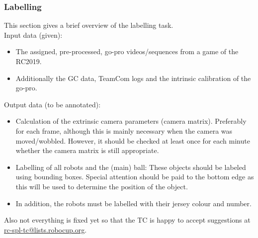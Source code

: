     \subsubsection{Labelling}
    This section gives a brief overview of the labelling task.\\

    Input data (given):
    \begin{itemize}
        \item The assigned, pre-processed, go-pro videos/sequences from a game of the RC2019.
        \item Additionally the GC data, TeamCom logs and the intrinsic calibration of the go-pro.
    \end{itemize}

    Output data (to be annotated):
    \begin{itemize}
        \item Calculation of the extrinsic camera parameters (camera matrix). Preferably for each frame, although this is mainly necessary when the camera was moved/wobbled. However, it should be checked at least once for each minute whether the camera matrix is still appropriate.
        \item Labelling of all robots and the (main) ball: These objects should be labeled using bounding boxes. Special attention should be paid to the bottom edge as this will be used to determine the position of the object.
        \item In addition, the robots must be labelled with their jersey colour and number.
    \end{itemize}
    Also not everything is fixed yet so that the TC is happy to accept suggestions at \url{rc-spl-tc@lists.robocup.org}.
